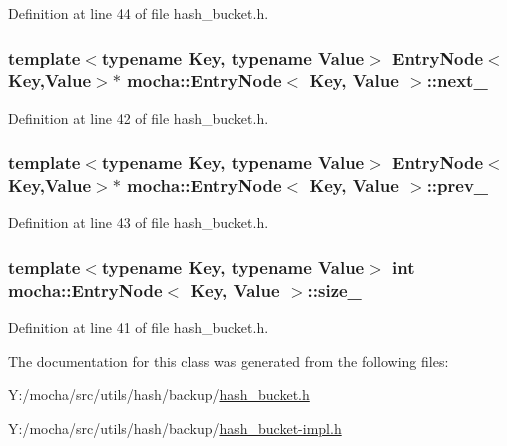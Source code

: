 Definition at line 44 of file hash\_\-bucket.h.

\hypertarget{classmocha_1_1_entry_node_a5ac0f7dac781153119c25a6f43b6621a}{
\subsubsection[{next\_\-}]{\setlength{\rightskip}{0pt plus 5cm}template$<$typename Key, typename Value$>$ {\bf EntryNode}$<$Key,Value$>$$\ast$ {\bf mocha::EntryNode}$<$ Key, Value $>$::{\bf next\_\-}}}
\label{classmocha_1_1_entry_node_a5ac0f7dac781153119c25a6f43b6621a}


Definition at line 42 of file hash\_\-bucket.h.

\hypertarget{classmocha_1_1_entry_node_ab0f8182df8e4e1bf8d297aa730bcd51a}{
\subsubsection[{prev\_\-}]{\setlength{\rightskip}{0pt plus 5cm}template$<$typename Key, typename Value$>$ {\bf EntryNode}$<$Key,Value$>$$\ast$ {\bf mocha::EntryNode}$<$ Key, Value $>$::{\bf prev\_\-}}}
\label{classmocha_1_1_entry_node_ab0f8182df8e4e1bf8d297aa730bcd51a}


Definition at line 43 of file hash\_\-bucket.h.

\hypertarget{classmocha_1_1_entry_node_a84d128dc83eceffa42600fbb157035a6}{
\subsubsection[{size\_\-}]{\setlength{\rightskip}{0pt plus 5cm}template$<$typename Key, typename Value$>$ int {\bf mocha::EntryNode}$<$ Key, Value $>$::{\bf size\_\-}}}
\label{classmocha_1_1_entry_node_a84d128dc83eceffa42600fbb157035a6}


Definition at line 41 of file hash\_\-bucket.h.



The documentation for this class was generated from the following files:\begin{DoxyCompactItemize}
\item 
Y:/mocha/src/utils/hash/backup/\hyperlink{backup_2hash__bucket_8h}{hash\_\-bucket.h}\item 
Y:/mocha/src/utils/hash/backup/\hyperlink{hash__bucket-impl_8h}{hash\_\-bucket-\/impl.h}\end{DoxyCompactItemize}
